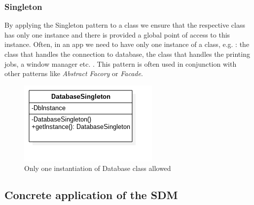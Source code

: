 \documentclass{article}[11]
\begin{document}
	\subsubsection{Singleton}
	By applying the Singleton pattern to a class we ensure that the respective class has only one instance and there is provided a global point of access to this instance. Often, in an app we need to have only one instance of a class, e.g. : the class that handles the connection to database, the class that handles the printing jobs, a window manager etc. . This pattern is often used in conjunction with other patterns like \emph{Abstract Facory} or \emph{Facade}.
	\begin{figure}[H]
		\centering
		\includegraphics[scale=0.9]{./imgs/Singleton}
		\caption{Only one instantiation of Database class allowed}
	\end{figure}

\subsection{Concrete application of the SDM}

\printacronyms[include-classes=abbrev,name=Abbreviations]




\end{document}
